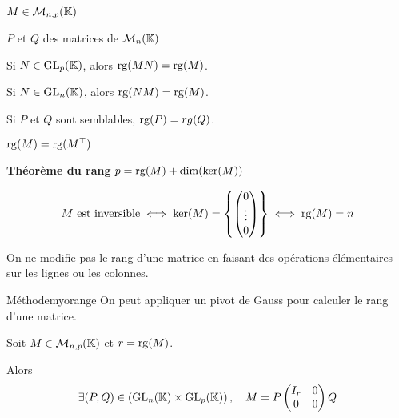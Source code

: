     \begin{prop}{}{}
        \begin{soit}
            \item $M \in \mathcal{M}_{n,p}(\mathbb{K})$
            \item $P$ et $Q$ des matrices de $\mathcal{M}_{n}(\mathbb{K})$
        \end{soit}

        \begin{alors}
            \item Si $N \in \operatorname{GL}_p(\mathbb{K})$, alors $\operatorname{rg}(MN) = \operatorname{rg}(M)$.
            \item Si $N \in \operatorname{GL}_n(\mathbb{K})$, alors $\operatorname{rg}(NM) = \operatorname{rg}(M)$.
            \item Si $P$ et $Q$ sont semblables, $\operatorname{rg}(P) = rg(Q)$.
            \item $\operatorname{rg}(M) = \operatorname{rg}(M^{\top})$
            \item \textbf{Théorème du rang} \quad $p = \operatorname{rg}(M) + \dim(\ker(M))$
            \item \[ M \text{ est inversible} \iff \ker(M) = \left\{ \begin{pmatrix}
            0 \\
            \vdots \\
            0
        \end{pmatrix} \right\} \iff \operatorname{rg}(M) = n \]
        \end{alors}
    \end{prop}

    \begin{coro}{}{}
        On ne modifie pas le rang d’une matrice en faisant des opérations élémentaires sur les lignes ou les colonnes.
    \end{coro}

    \begin{omed}{Méthode}{myorange}
        On peut appliquer un pivot de Gauss pour calculer le rang d’une matrice.
    \end{omed}

    \begin{theo}{}{}
        Soit $M \in \mathcal{M}_{n,p}(\mathbb{K})$ et $r = \operatorname{rg}(M)$.

        Alors
        \[ \exists (P,Q) \in \left(\operatorname{GL}_n(\mathbb{K}) \times \operatorname{GL}_p(\mathbb{K})\right), \quad  M = P \begin{pmatrix}
                I_r & 0 \\
                0 & 0
            \end{pmatrix} Q \]
    \end{theo}

